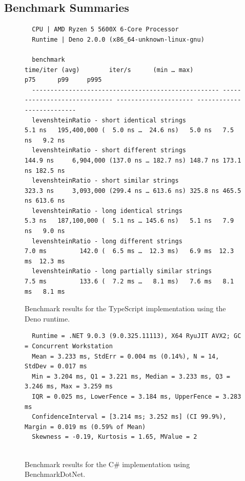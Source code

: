 \begin{landscape}
\subsection{Benchmark Summaries}
\label{ssec:benchmark-s}
\begin{figure}[H]
  \caption{Benchmark results for the TypeScript implementation using the Deno runtime.}
  \label{code:benchmark-typescript}
  \begin{verbatim}
  CPU | AMD Ryzen 5 5600X 6-Core Processor
  Runtime | Deno 2.0.0 (x86_64-unknown-linux-gnu)

  benchmark                                           time/iter (avg)        iter/s      (min … max)           p75      p99     p995
  --------------------------------------------------- ----------------------------- --------------------- --------------------------
  levenshteinRatio - short identical strings                   5.1 ns   195,400,000 (  5.0 ns …  24.6 ns)   5.0 ns   7.5 ns   9.2 ns
  levenshteinRatio - short different strings                 144.9 ns     6,904,000 (137.0 ns … 182.7 ns) 148.7 ns 173.1 ns 182.5 ns
  levenshteinRatio - short similar strings                   323.3 ns     3,093,000 (299.4 ns … 613.6 ns) 325.8 ns 465.5 ns 613.6 ns
  levenshteinRatio - long identical strings                    5.3 ns   187,100,000 (  5.1 ns … 145.6 ns)   5.1 ns   7.9 ns   9.0 ns
  levenshteinRatio - long different strings                    7.0 ms         142.0 (  6.5 ms …  12.3 ms)   6.9 ms  12.3 ms  12.3 ms
  levenshteinRatio - long partially similar strings            7.5 ms         133.6 (  7.2 ms …   8.1 ms)   7.6 ms   8.1 ms   8.1 ms
  \end{verbatim}
\end{figure}

\hfill

\begin{figure}[H]
  \caption{Benchmark results for the C\# implementation using BenchmarkDotNet.}
  \label{code:benchmark-csharp}
  \begin{verbatim}
  Runtime = .NET 9.0.3 (9.0.325.11113), X64 RyuJIT AVX2; GC = Concurrent Workstation
  Mean = 3.233 ms, StdErr = 0.004 ms (0.14%), N = 14, StdDev = 0.017 ms
  Min = 3.204 ms, Q1 = 3.221 ms, Median = 3.233 ms, Q3 = 3.246 ms, Max = 3.259 ms
  IQR = 0.025 ms, LowerFence = 3.184 ms, UpperFence = 3.283 ms
  ConfidenceInterval = [3.214 ms; 3.252 ms] (CI 99.9%), Margin = 0.019 ms (0.59% of Mean)
  Skewness = -0.19, Kurtosis = 1.65, MValue = 2


\end{verbatim}
\end{figure}
\end{landscape}
